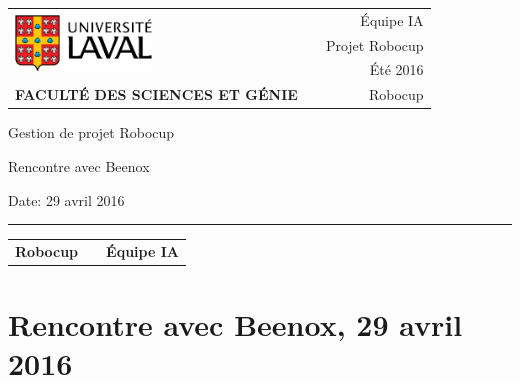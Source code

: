 \documentclass[12pt,letterpaper,twoside]{article}
\begin{document}
\setcounter{secnumdepth}{0}
\begin{titlepage}

        \vspace*{1cm}
        \begin{small}
        \begin{tabularx}{\textwidth}{ l X r }
        \multirow{3}{*}{\includegraphics[height=1.5cm,keepaspectratio]{ul_logo.pdf}}
        && \'Equipe IA\\
        && Projet Robocup\\
        && Été 2016\\

        \scriptsize{\textbf{FACULTÉ DES SCIENCES ET GÉNIE}} && Robocup
        \end{tabularx}
        \end{small}

        \vfill

        \begin{center}

        Gestion de projet Robocup

        \vspace{0.5cm}

        Rencontre avec Beenox

        \vspace{2cm}

        \end{center}

        \vfill

        Date: 29 avril 2016

        \vspace{0.4cm}

        \rule{\textwidth}{2pt}

        \vspace{0.3cm}

        \begin{tabularx}{\textwidth}{ l X r }

        \textbf{Robocup} && \textbf{\'Equipe IA} \\

        \end{tabularx}


\end{titlepage}


\section*{Rencontre avec Beenox, 29 avril 2016}
\end{document}
